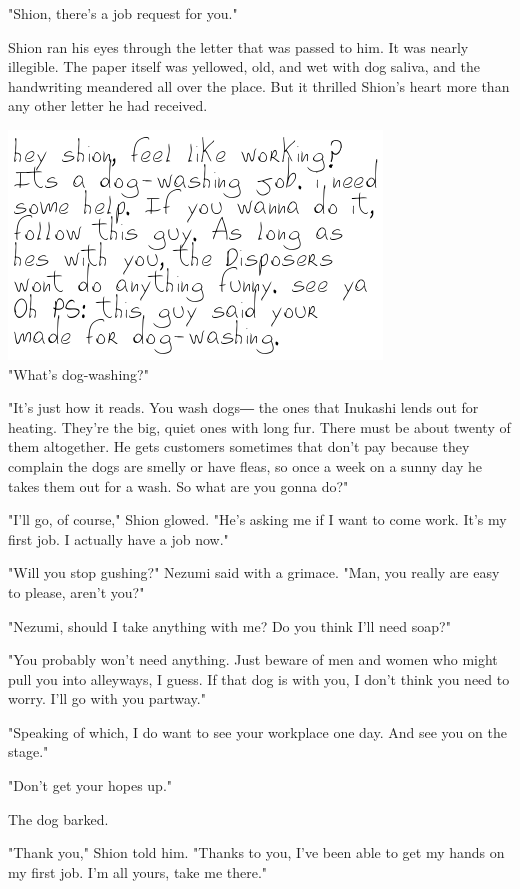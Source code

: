 "Shion, there's a job request for you."

Shion ran his eyes through the letter that was passed to him. It was
nearly illegible. The paper itself was yellowed, old, and wet with dog
saliva, and the handwriting meandered all over the place. But it
thrilled Shion's heart more than any other letter he had received.

\includegraphics{Images/memo4.png}\\

"What's dog-washing?"

"It's just how it reads. You wash dogs― the ones that Inukashi lends out
for heating. They're the big, quiet ones with long fur. There must be
about twenty of them altogether. He gets customers sometimes that don't
pay because they complain the dogs are smelly or have fleas, so once a
week on a sunny day he takes them out for a wash. So what are you gonna
do?"

"I'll go, of course," Shion glowed. "He's asking me if I want to come
work. It's my first job. I actually have a job now."

"Will you stop gushing?" Nezumi said with a grimace. "Man, you really
are easy to please, aren't you?"

"Nezumi, should I take anything with me? Do you think I'll need soap?"

"You probably won't need anything. Just beware of men and women who
might pull you into alleyways, I guess. If that dog is with you, I don't
think you need to worry. I'll go with you partway."

"Speaking of which, I do want to see your workplace one day. And see you
on the stage."

"Don't get your hopes up."

The dog barked.

"Thank you," Shion told him. "Thanks to you, I've been able to get my
hands on my first job. I'm all yours, take me there."

